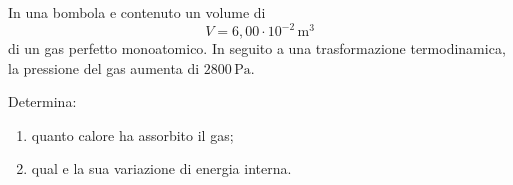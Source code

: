 
\begin{esercizio}
In una bombola e contenuto un volume di
\[
V=6{,}00\cdot 10^{-2}\,\mathrm{m^3}
\]
di un gas perfetto monoatomico. In seguito a una trasformazione termodinamica,
la pressione del gas aumenta di \(2800\,\mathrm{Pa}\).

Determina:
\begin{enumerate}
    \item quanto calore ha assorbito il gas;
    \item qual e la sua variazione di energia interna.
\end{enumerate}
\end{esercizio}

